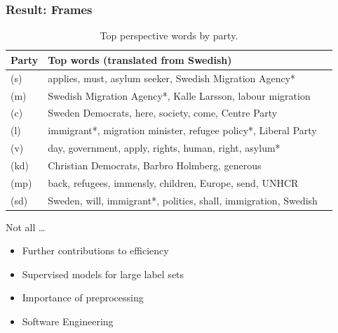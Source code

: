 \documentclass[compress]{beamer}
\begin{document}
\begin{frame}
\frametitle{Result: Frames}

\begin{table}[ht]
\centering
\begin{tabular}{lll}
  \hline
Party & Top words (translated from Swedish)\\
  \hline
  \footnotesize	(s) &   \footnotesize	applies, must, asylum seeker, Swedish Migration Agency* \\
  \footnotesize	(m) & \footnotesize Swedish Migration Agency*, Kalle Larsson, labour migration \\
  \footnotesize	(c) &  \footnotesize Sweden Democrats, here, society, come, Centre Party \\
  \footnotesize (l) & \footnotesize immigrant*, migration minister, refugee policy*, Liberal Party \\
  \footnotesize (v) & \footnotesize day, government, apply, rights, human, right, asylum* \\
  \footnotesize (kd) & \footnotesize Christian Democrats, Barbro Holmberg, generous \\
  \footnotesize (mp) & \footnotesize back, refugees, immensly, children, Europe, send, UNHCR \\
  \footnotesize (sd) & \footnotesize Sweden, will, immigrant*, politics, shall, immigration, Swedish \\
  \hline
\end{tabular}
\caption{Top perspective words by party.}
\label{tab:perspective_topic_types_eng}
\end{table}

\end{frame}


\begin{frame}{Not all \dots}

\begin{itemize}
  \item Further contributions to efficiency
  \item Supervised models for large label sets
  \item Importance of preprocessing
  \item Software Engineering
\end{itemize}

\end{frame}
\end{document}
